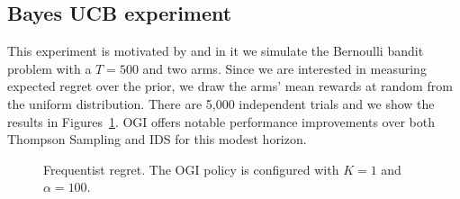 \subsection{Bayes UCB experiment} \label{exp:bayes_ucb}
This experiment is motivated by \cite{kaufmann2012bayesian} and in it we simulate the Bernoulli bandit problem with a $T = 500$ and two arms. Since we are interested in measuring expected regret over the prior, we draw the arms' mean rewards at random from the uniform distribution. There are 5,000 independent trials and we show the results in Figures~\ref{fig:kaufmann_regret}. OGI offers notable performance improvements over both Thompson Sampling and IDS for this modest horizon.
\begin{figure}[h!]
	\centering
	
	\caption{Frequentist regret. The OGI policy is configured with $K=1$ and $\alpha=100$.}
	\label{fig:kaufmann_regret}
\end{figure}
